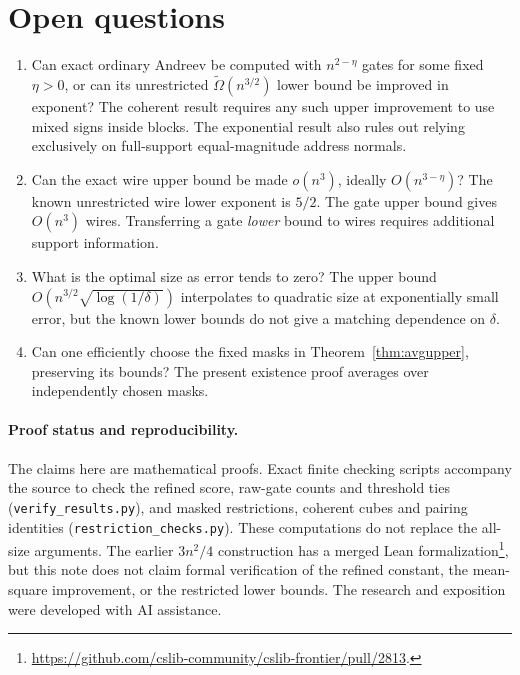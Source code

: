 \documentclass[11pt]{article}
\begin{document}
\section{Open questions}
\begin{enumerate}
\item Can exact ordinary Andreev be computed with $n^{2-\eta}$ gates for
some fixed $\eta>0$, or can its unrestricted $\widetilde\Omega(n^{3/2})$
lower bound be improved in exponent? The coherent result requires any
such upper improvement to use mixed signs inside blocks. The exponential
result also rules out relying exclusively on full-support equal-magnitude
address normals.
\item Can the exact wire upper bound be made $o(n^3)$, ideally
$O(n^{3-\eta})$? The known unrestricted wire lower exponent is $5/2$.
The gate upper bound gives $O(n^3)$ wires. Transferring a gate
\emph{lower} bound to wires requires additional support information.
\item What is the optimal size as error tends to zero? The upper bound
$O(n^{3/2}\sqrt{\log(1/\delta)})$ interpolates to quadratic size at
exponentially small error, but the known lower bounds do not give a
matching dependence on $\delta$.
\item Can one efficiently choose the fixed masks in
Theorem~\ref{thm:avgupper}, preserving its bounds? The present existence
proof averages over independently chosen masks.
\end{enumerate}

\paragraph{Proof status and reproducibility.}
The claims here are mathematical proofs. Exact finite checking scripts
accompany the source to check the refined score, raw-gate counts and threshold ties
(\texttt{verify\_results.py}), and masked restrictions, coherent cubes and
pairing identities (\texttt{restriction\_checks.py}). These computations
do not replace the all-size arguments. The earlier $3n^2/4$ construction
has a merged Lean formalization\footnote{\url{https://github.com/cslib-community/cslib-frontier/pull/2813}.},
but this note does not claim formal verification of
the refined constant, the mean-square improvement, or the restricted lower
bounds. The research and exposition were developed with AI assistance.
\end{document}
